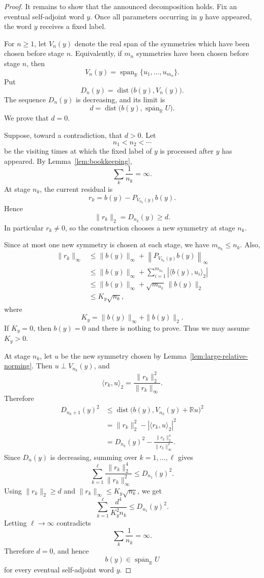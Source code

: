 \documentclass[11pt,letterpaper,reqno]{amsart}
\theoremstyle{definition}
\numberwithin{equation}{section}
\newcommand{\RR}{\mathbb R}
\DeclareMathOperator{\spanop}{span}
\DeclareMathOperator{\dist}{dist}
\begin{document}
\begin{proof}
It remains to show that the announced decomposition holds.  Fix an eventual
self-adjoint word \(y\).  Once all parameters occurring in \(y\) have appeared,
the word \(y\) receives a fixed label.

For \(n\geq1\), let \(V_n(y)\) denote the real span of the symmetries which
have been chosen before stage \(n\).  Equivalently, if \(m_n\) symmetries have
been chosen before stage \(n\), then
\[
   V_n(y)=\spanop_{\RR}\{u_1,\ldots,u_{m_n}\}.
\]
Put
\[
   D_n(y)=\dist\bigl(b(y),V_n(y)\bigr).
\]
The sequence \(D_n(y)\) is decreasing, and its limit is
\[
   d=\dist\bigl(b(y),\overline{\spanop_{\RR}}U\bigr).
\]
We prove that \(d=0\).

Suppose, toward a contradiction, that \(d>0\).  Let
\[
   n_1<n_2<\cdots
\]
be the visiting times at which the fixed label of \(y\) is processed after
\(y\) has appeared.  By Lemma~\ref{lem:bookkeeping},
\[
   \sum_k\frac1{n_k}=\infty .
\]
At stage \(n_k\), the current residual is
\[
   r_k=b(y)-P_{V_{n_k}(y)}b(y).
\]
Hence
\[
   \|r_k\|_2=D_{n_k}(y)\geq d .
\]
In particular \(r_k\neq0\), so the construction chooses a new symmetry at
stage \(n_k\).

Since at most one new symmetry is chosen at each stage, we have \(m_{n_k}\leq
n_k\).  Also,
\[
\begin{aligned}
   \|r_k\|_\infty
   &\leq \|b(y)\|_\infty+
   \left\|P_{V_{n_k}(y)}b(y)\right\|_\infty       \\
   &\leq \|b(y)\|_\infty+
      \sum_{i=1}^{m_{n_k}}|\langle b(y),u_i\rangle_2|                         \\
   &\leq \|b(y)\|_\infty+\sqrt{m_{n_k}}\,\|b(y)\|_2                             \\
   &\leq K_y\sqrt{n_k},
\end{aligned}
\]
where
\[
   K_y=\|b(y)\|_\infty+\|b(y)\|_2 .
\]
If \(K_y=0\), then \(b(y)=0\) and there is nothing to prove.  Thus we may
assume \(K_y>0\).

At stage \(n_k\), let \(u\) be the new symmetry chosen by
Lemma~\ref{lem:large-relative-norming}.  Then \(u\perp V_{n_k}(y)\), and
\[
   \langle r_k,u\rangle_2=\frac{\|r_k\|_2^2}{\|r_k\|_\infty}.
\]
Therefore
\[
\begin{aligned}
   D_{n_k+1}(y)^2
   &\leq
   \dist\bigl(b(y),V_{n_k}(y)+\mathbb R u\bigr)^2  \\
   &=
   \|r_k\|_2^2-|\langle r_k,u\rangle_2|^2  \\
   &=
   D_{n_k}(y)^2-
   \frac{\|r_k\|_2^4}{\|r_k\|_\infty^2}.
\end{aligned}
\]
Since \(D_n(y)\) is decreasing, summing over \(k=1,\ldots,\ell\) gives
\[
   \sum_{k=1}^{\ell}
   \frac{\|r_k\|_2^4}{\|r_k\|_\infty^2}
   \leq D_{n_1}(y)^2 .
\]
Using \(\|r_k\|_2\ge d\) and
\(\|r_k\|_\infty\le K_y\sqrt{n_k}\), we get
\[
   \sum_{k=1}^{\ell}\frac{d^4}{K_y^2n_k}
   \leq D_{n_1}(y)^2 .
\]
Letting \(\ell\to\infty\) contradicts
\[
   \sum_k\frac1{n_k}=\infty .
\]
Therefore \(d=0\), and hence
\[
   b(y)\in\overline{\spanop_{\RR}}U
\]
for every eventual self-adjoint word \(y\).


\end{proof}
\end{document}
